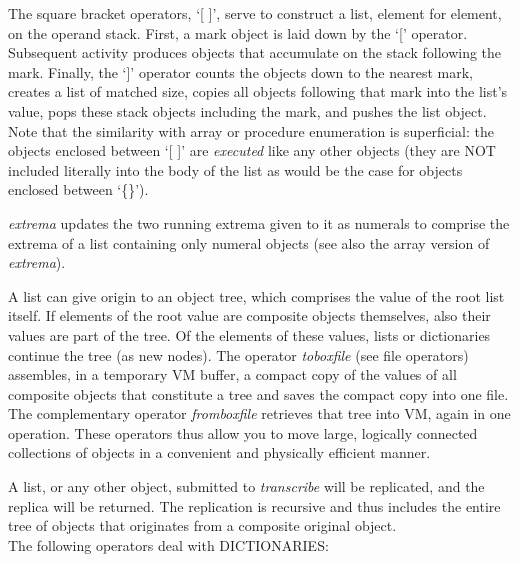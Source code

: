 \index{Operators![}
\index{Operators!]}

The square bracket operators,  `[ ]', serve to construct a list, element for element,  on the operand stack.  First,  a mark object is laid down  by the `[' operator. Subsequent  activity  produces  objects  that  accumulate  on  the   stack following the mark.  Finally, the `]' operator counts the objects down to the nearest mark, creates a list of matched size, copies all objects following that mark into the list's value,  pops these stack objects including the mark, and pushes   the  list object.  Note  that the similarity with array or procedure enumeration  is superficial:  the objects enclosed between `[ ]' are \emph{executed} like any other objects (they are NOT included literally into the body of the list as would be the case for objects enclosed between `\{\}').

\emph{extrema} updates the two running extrema given to it as numerals to comprise the extrema of a list containing only numeral objects (see also the array version of \emph{extrema}).

A  list  can give origin to an object tree,  which comprises the value of the root list itself. If elements of the root value are composite objects themselves,  also their values are part  of the tree.  Of the elements of these values, lists or dictionaries continue the  tree (as new nodes). The operator \emph{toboxfile} (see file operators) assembles,  in a temporary VM buffer, a compact copy  of  the values of all composite objects that  constitute  a tree  and  saves the compact copy into one file.  The complementary operator \emph{fromboxfile} retrieves that tree into VM,  again in one operation. These operators  thus allow you to move large,  logically connected collections of objects in  a convenient and physically efficient manner.

A list, or any other object, submitted to \emph{transcribe} will be replicated, and the replica will be returned. The replication is recursive and thus includes the entire tree of objects that originates from a composite original object.\\

\noindent The following operators deal with DICTIONARIES:\\

